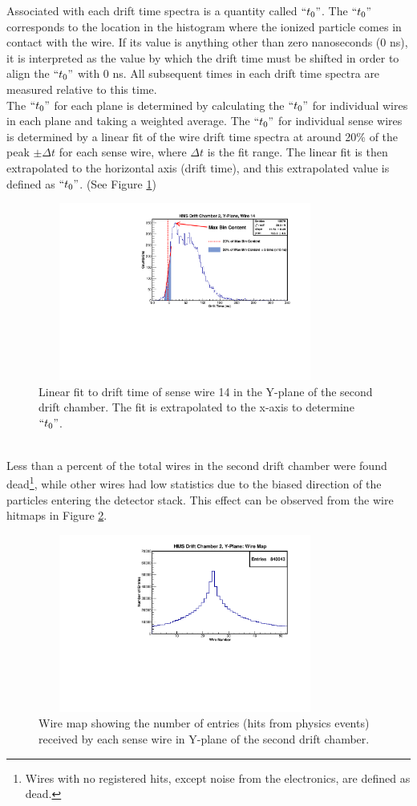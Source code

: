\documentclass[journal, a4paper]{IEEEtran}
\begin{document}
Associated with each drift time spectra is a quantity called $``t_{0}"$. The $``t_{0}"$ corresponds to the
location in the histogram where the ionized particle comes in contact with the wire. If its value is anything other
than zero nanoseconds (0 ns), it is interpreted as the value by which the drift time must be shifted in order to
align the $``t_{0}"$ with 0 ns. All subsequent times in each drift time spectra are measured relative to this time.\\
\indent The $``t_{0}"$ for each plane is determined by calculating the $``t_{0}"$ for individual wires in each plane and taking a
weighted average. The $``t_{0}"$ for individual sense wires is determined by a linear fit of the wire drift time spectra at around 20\% of the peak
$\pm \Delta t$ for each sense wire, where $\Delta t$ is the fit range. The linear fit is then extrapolated to the
horizontal axis (drift time), and this extrapolated value is defined as $``t_{0}"$. (See Figure \ref{fig:wire_fit})
\begin{figure}[!ht]
  \centering
  \includegraphics[width=3.8in, height=2.3in]{hdc2y1_w14_fit.pdf}
  \caption{Linear fit to drift time of sense wire 14 in the Y-plane of the second drift chamber. The fit is extrapolated to the
  x-axis to determine $``t_{0}"$. }
  \label{fig:wire_fit}
\end{figure} \\
Less than a percent of the total wires in the second drift chamber were found dead\footnote{Wires with no registered hits, except noise from the electronics, are defined as dead.}, while other wires had
low statistics due to the biased direction of the particles entering the detector stack. This effect can be observed
from the wire hitmaps in Figure \ref{fig:hdc2y1_hitmap}.
\begin{figure}[!ht]
  \centering
  \includegraphics[width=3.8in, height=2.3in]{hdc2y1_wiremap.pdf}
  \caption{Wire map showing the number of entries (hits from physics events) received by each sense wire in Y-plane of
  the second drift chamber.}
  \label{fig:hdc2y1_hitmap}
\end{figure}
\end{document}
